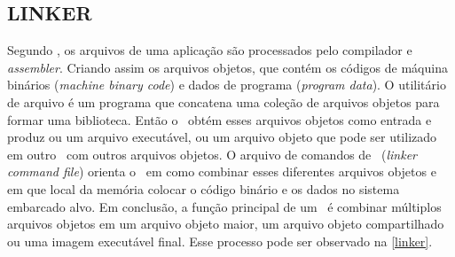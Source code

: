 






\subsection{LINKER}

Segundo , os arquivos de uma aplicação são processados pelo compilador e \textit{assembler}. Criando assim os arquivos objetos, que contém os códigos de máquina binários (\textit{machine binary code}) e dados de programa (\textit{program data}).
O utilitário de arquivo é um programa que concatena uma coleção de arquivos objetos para formar uma biblioteca. Então o \linker\ obtém esses arquivos objetos como entrada e produz ou um arquivo executável, ou um arquivo objeto que pode ser utilizado em outro \linker\ com outros arquivos objetos.
O arquivo de comandos de \linker\ (\textit{linker command file}) orienta o \linker\ em como combinar esses diferentes arquivos objetos e em que local da memória colocar o código binário e os dados no sistema embarcado alvo.
Em conclusão, a função principal de um \linker\ é combinar múltiplos arquivos objetos em um arquivo objeto maior, um arquivo objeto compartilhado ou uma imagem executável final. Esse processo pode ser observado na \autoref{linker}.

